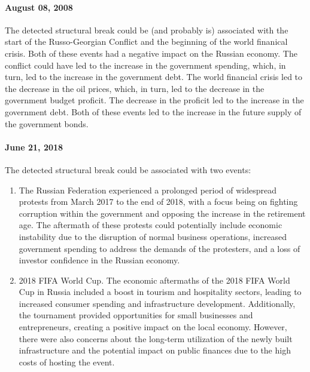             \paragraph{August 08, 2008} The detected structural break could be (and probably is) associated with the start of the 
            Russo-Georgian Conflict and the beginning of the world finanical crisis. Both of these events had 
            a negative impact on the Russian economy. The conflict could have led to the increase in the government spending, which, 
            in turn, led to the increase in the government debt. The world financial crisis led to the decrease in the oil prices, 
            which, in turn, led to the decrease in the government budget proficit. The decrease in the proficit led to the increase 
            in the government debt. Both of these events led to the increase in the future supply of the government bonds. 
            \paragraph{June 21, 2018} The detected structural break could be associated with two events:
            \begin{enumerate}
                \item The Russian Federation experienced a prolonged period of widespread protests from March 2017 to the end of 
                2018, with a focus being on fighting corruption within the government and opposing the increase in the retirement age. 
                The aftermath of these protests could potentially include economic instability due to the disruption of normal business
                operations, increased government spending to address the demands of the protesters, and a loss of investor confidence in 
                the Russian economy. 
                \item 2018 FIFA World Cup. The economic aftermaths of the 2018 FIFA World Cup in Russia included a boost in tourism and 
                hospitality sectors, leading to increased consumer spending and infrastructure development. Additionally, the tournament 
                provided opportunities for small businesses and entrepreneurs, creating a positive impact on the local economy. However, 
                there were also concerns about the long-term utilization of the newly built infrastructure and the potential impact on 
                public finances due to the high costs of hosting the event. 
            \end{enumerate} 
